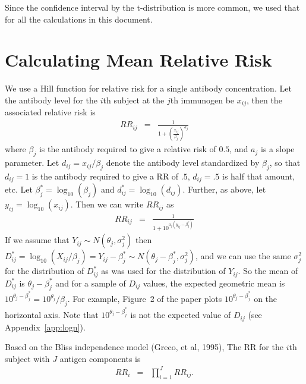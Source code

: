 \documentclass{article}[12pt]
\begin{document}
Since the confidence interval by the t-distribution is more common, we used that for all the calculations in this document. 

\section{Calculating Mean Relative Risk}
\label{sec:meanRR}

We use a Hill function for relative risk for a single antibody concentration. Let the antibody level for the $i$th subject 
at the $j$th immunogen be $x_{ij}$, then the associated relative risk is 
\begin{eqnarray*}
RR_{ij} & = & \frac{ 1}{1+\left( \frac{x_{ij}}{\beta_j } \right)^{a_j}}
\end{eqnarray*}
where $\beta_j$ is the antibody required to give a relative risk of $0.5$,
and $a_j$ is a slope parameter. Let $d_{ij}=x_{ij}/\beta_j$ denote the antibody level standardized by $\beta_j$, so that 
$d_{ij}=1$ is the antibody required to give a RR of $.5$,  
$d_{ij}=.5$ is half that amount, etc.  
Let $\beta_j^*=\log_{10}(\beta_j)$ and $d_{ij}^* = \log_{10}(d_{ij})$. Further, as above, let 
$y_{ij} = \log_{10}(x_{ij})$. Then we can write $RR_{ij}$ as 
\begin{eqnarray*}
RR_{ij} & = & \frac{ 1}{1+10^{a_j \left( y_{ij} - \beta_j^* \right)  } }
\end{eqnarray*}
If we assume that $Y_{ij} \sim N(\theta_j, \sigma^2_j)$ then 
$D_{ij}^* =\log_{10}(X_{ij}/\beta_j) =  Y_{ij}-\beta_j^* \sim N(\theta_j-\beta_j^*, \sigma^2_j)$, and 
we can use the same $\sigma^2_j$ for the distribution of $D_{ij}^*$ as was used for the distribution of $Y_{ij}$. 
So the mean of $D_{ij}^*$ is $\theta_j - \beta^*_j$ and for a sample of $D_{ij}$ values, the expected geometric mean is 
$10^{\theta_j -\beta_j^*} = 10^{\theta_j}/\beta_j$.  For  example,  Figure~2 of the paper plots $10^{\theta_j -\beta_j^*}$ on the horizontal 
axis. Note that $10^{\theta_j -\beta_j^*}$ is not the expected value of $D_{ij}$ (see Appendix~\ref{app:logn}).


Based on the Bliss independence model (Greco, et al, 1995), The RR for the $i$th subject with $J$ antigen components is 
\begin{eqnarray}
RR_{i} & = & \prod_{i=1}^{J} RR_{ij}. \label{eq:RRi}
\end{eqnarray}
\end{document}

